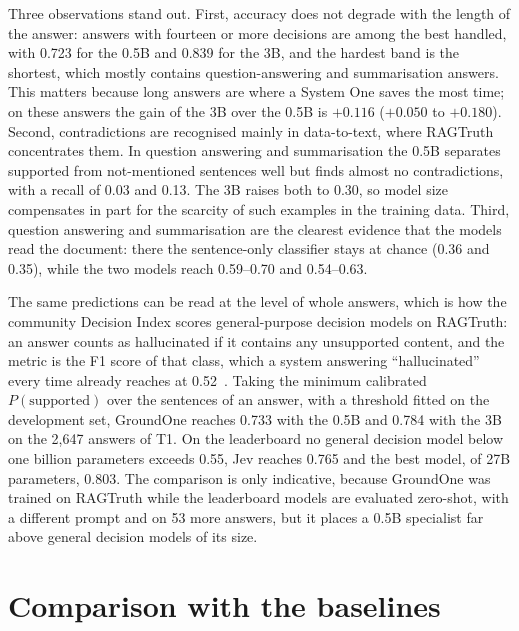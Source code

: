 Three observations stand out. First, accuracy does not degrade with the length of the answer: answers with fourteen or
more decisions are among the best handled, with 0.723 for the 0.5B and 0.839 for the 3B, and the hardest band is the
shortest, which mostly contains question-answering and summarisation answers. This matters because long answers are
where a System One saves the most time; on these answers the gain of the 3B over the 0.5B is $+0.116$ ($+0.050$ to
$+0.180$). Second, contradictions are recognised mainly in data-to-text, where RAGTruth concentrates them. In question
answering and summarisation the 0.5B separates supported from not-mentioned sentences well but finds almost no
contradictions, with a recall of 0.03 and 0.13. The 3B raises both to 0.30, so model size compensates in part for the
scarcity of such examples in the training data. Third, question answering and summarisation are the clearest evidence
that the models read the document: there the sentence-only classifier stays at chance (0.36 and 0.35), while the two
models reach 0.59--0.70 and 0.54--0.63.

The same predictions can be read at the level of whole answers, which is how the community Decision Index scores
general-purpose decision models on RAGTruth: an answer counts as hallucinated if it contains any unsupported content,
and the metric is the F1 score of that class, which a system answering ``hallucinated'' every time already reaches at
0.52~\cite{decisionindex2026}. Taking the minimum calibrated $P(\text{supported})$ over the sentences of an answer, with
a threshold fitted on the development set, GroundOne reaches 0.733 with the 0.5B and 0.784 with the 3B on the 2{,}647
answers of T1. On the leaderboard no general decision model below one billion parameters exceeds 0.55, Jev reaches 0.765
and the best model, of 27B parameters, 0.803. The comparison is only indicative, because GroundOne was trained on RAGTruth
while the leaderboard models are evaluated zero-shot, with a different prompt and on 53 more answers, but it places a 0.5B
specialist far above general decision models of its size.

\section{Comparison with the baselines}
\label{sec:results-baselines}

